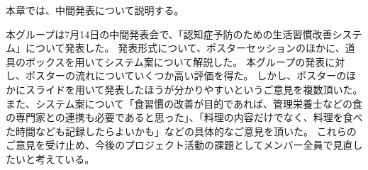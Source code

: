 \documentclass[../report]{subfiles}
\begin{document}
本章では、中間発表について説明する。

本グループは7月14日の中間発表会で、「認知症予防のための生活習慣改善システム」について発表した。
発表形式について、ポスターセッションのほかに、道具のボックスを用いてシステム案について解説した。
本グループの発表に対し、ポスターの流れについていくつか高い評価を得た。
しかし、ポスターのほかにスライドを用いて発表したほうが分かりやすいというご意見を複数頂いた。
また、システム案について「食習慣の改善が目的であれば、管理栄養士などの食の専門家との連携も必要であると思った」、「料理の内容だけでなく、料理を食べた時間なども記録したらよいかも」などの具体的なご意見を頂いた。
これらのご意見を受け止め、今後のプロジェクト活動の課題としてメンバー全員で見直したいと考えている。
\end{document}

